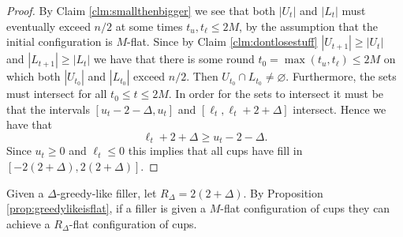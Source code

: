 \documentclass[twocolumn]{article}[10pt]
\begin{document}
\begin{proof}
  By Claim \ref{clm:smallthenbigger} we see that both $|U_t|$ and $|L_t|$ must
  eventually exceed $n/2$ at some times $t_u, t_\ell \le 2M$, by the assumption
  that the initial configuration is $M$-flat. Since by Claim
  \ref{clm:dontlosestuff} $|U_{t+1}|\ge |U_t|$ and $|L_{t+1}| \ge |L_t|$ we
  have that there is some round $t_0 =\max(t_u, t_\ell) \le 2M$ on which both
  $|U_{t_0}|$ and $|L_{t_0}|$ exceed $n/2$. Then $U_{t_0} \cap L_{t_0} \neq
  \varnothing$. Furthermore, the sets must intersect for all $t_0 \le t \le 2M$. 
  In order for the sets to intersect it must be that the intervals
  $[u_t-2-\Delta, u_t]$ and $[\ell_t, \ell_t+2+\Delta]$ intersect. Hence we have that 
  $$\ell_t+2+\Delta \ge u_t-2-\Delta.$$ Since $u_t \ge 0$ and $\ell_t \le 0$
  this implies that all cups have fill in $[-2(2+\Delta), 2(2+\Delta)]$.

\end{proof}

Given a $\Delta$-greedy-like filler, let $R_\Delta = 2(2+\Delta).$ By
Proposition \ref{prop:greedylikeisflat}, if a filler is given a $M$-flat
configuration of cups they can achieve a $R_\Delta$-flat configuration of cups.
\end{document}
